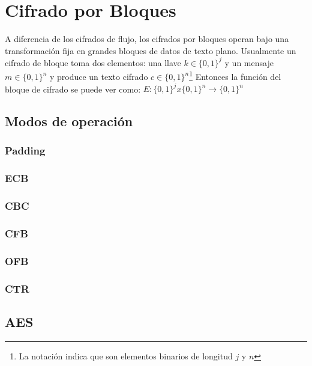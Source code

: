 \section{Cifrado por Bloques} 

A diferencia de los cifrados de flujo, los cifrados por bloques operan bajo una transformación fija en grandes bloques de datos de texto plano. Usualmente un cifrado de bloque toma dos elementos: una llave $k \in \{0,1\}^j$ y un mensaje $m \in \{0,1\}^n$  y produce un texto cifrado $c \in \{0,1\}^n$\footnote{La notación indica que son elementos binarios de longitud $j$ y $n$} Entonces la función del bloque de cifrado se puede ver como: $E : \{0,1\}^j x  \{0,1\}^n \to \{0,1\}^n $
\subsection{Modos de operación}
	\subsubsection{Padding}
	\subsubsection{ECB}
	\subsubsection{CBC}
	\subsubsection{CFB}
	\subsubsection{OFB}
	\subsubsection{CTR}
\subsection{AES}




 
 
 